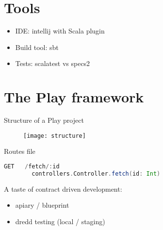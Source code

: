 \documentclass[10pt]{beamer}
\begin{document}
\section{Tools}

\begin{frame}
\begin{itemize}
\item IDE: intellij with Scala plugin
\item Build tool: sbt
\item Tests: scalatest vs specs2
\end{itemize}
\end{frame}

\section{The Play framework}
%
%

\begin{frame}
Structure of a Play project

\begin{figure}
\centering
\texttt{[image: structure]}
\end{figure}
\end{frame}





\begin{frame}[fragile]
Routes file
\begin{lstlisting}[language=Scala, basicstyle=\ttfamily]
GET   /fetch/:id   
        controllers.Controller.fetch(id: Int)
\end{lstlisting}
\end{frame}

\begin{frame}
A taste of contract driven development:
\begin{itemize}
\item apiary / blueprint 
\item dredd testing (local / staging) 
\end{itemize}
\end{frame}
\end{document}
